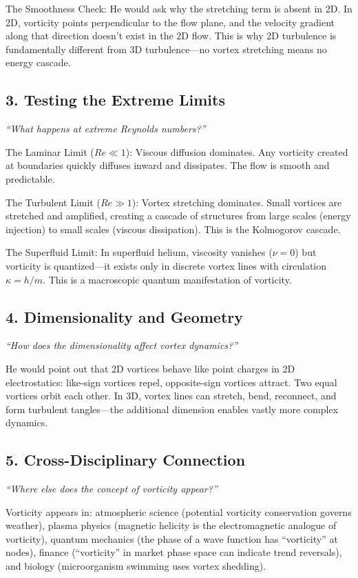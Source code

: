 The Smoothness Check: He would ask why the stretching term is absent in 2D. In 2D, vorticity points perpendicular to the flow plane, and the velocity gradient along that direction doesn't exist in the 2D flow. This is why 2D turbulence is fundamentally different from 3D turbulence---no vortex stretching means no energy cascade.

\subsection*{3. Testing the Extreme Limits}
\textit{``What happens at extreme Reynolds numbers?''}

The Laminar Limit ($Re \ll 1$): Viscous diffusion dominates. Any vorticity created at boundaries quickly diffuses inward and dissipates. The flow is smooth and predictable.

The Turbulent Limit ($Re \gg 1$): Vortex stretching dominates. Small vortices are stretched and amplified, creating a cascade of structures from large scales (energy injection) to small scales (viscous dissipation). This is the Kolmogorov cascade.

The Superfluid Limit: In superfluid helium, viscosity vanishes ($\nu = 0$) but vorticity is quantized---it exists only in discrete vortex lines with circulation $\kappa = h/m$. This is a macroscopic quantum manifestation of vorticity.

\subsection*{4. Dimensionality and Geometry}
\textit{``How does the dimensionality affect vortex dynamics?''}

He would point out that 2D vortices behave like point charges in 2D electrostatics: like-sign vortices repel, opposite-sign vortices attract. Two equal vortices orbit each other. In 3D, vortex lines can stretch, bend, reconnect, and form turbulent tangles---the additional dimension enables vastly more complex dynamics.

\subsection*{5. Cross-Disciplinary Connection}
\textit{``Where else does the concept of vorticity appear?''}

Vorticity appears in: atmospheric science (potential vorticity conservation governs weather), plasma physics (magnetic helicity is the electromagnetic analogue of vorticity), quantum mechanics (the phase of a wave function has ``vorticity'' at nodes), finance (``vorticity'' in market phase space can indicate trend reversals), and biology (microorganism swimming uses vortex shedding).
